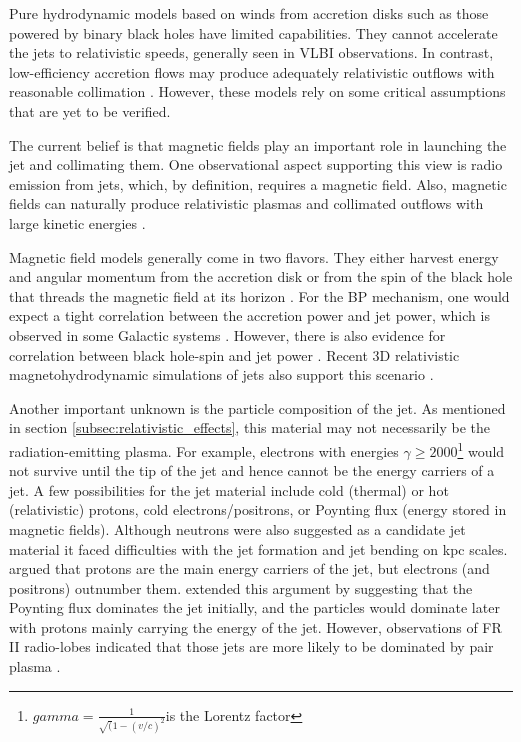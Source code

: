 Pure hydrodynamic models based on winds from accretion disks such as those powered by binary black holes \citep[e.g.,][]{1973A&A....24..337S} have limited capabilities. They cannot accelerate the jets to relativistic speeds, generally seen in VLBI observations. In contrast, low-efficiency accretion flows may produce adequately relativistic outflows with reasonable collimation \citep{rees1982ion,das1998observational}. However, these models rely on some critical assumptions that are yet to be verified.

The current belief is that magnetic fields play an important role in launching the jet and collimating them. One observational aspect supporting this view is radio emission from jets, which, by definition, requires a magnetic field. Also, magnetic fields can naturally produce relativistic plasmas and collimated outflows with large kinetic energies \citep[e.g.,][]{heinz2000jet}. 

Magnetic field models generally come in two flavors. They either harvest energy and angular momentum from the accretion disk \citep[e.g.,][BP]{blandford1982hydromagnetic} or from the spin of the black hole that threads the magnetic field at its horizon \citep[e.g.,][BZ]{blandford1977electromagnetic}. For the BP mechanism, one would expect a tight correlation between the accretion power and jet power, which is observed in some Galactic systems \citep[e.g.,][]{willott1999emission}. However, there is also evidence for correlation between black hole-spin and  jet power \citep[e.g.,][]{mcclintock2013black}. Recent 3D relativistic magnetohydrodynamic simulations of jets also support this scenario \citep{mckinney2006general,tchekhovskoy2011efficient,marti2019numerical}.

Another important unknown is the particle composition of the jet. As mentioned in section \ref{subsec:relativistic_effects}, this material may not necessarily be the radiation-emitting plasma. For example, electrons with energies $\gamma\geq2000$\footnote{$gamma=\frac{1}{\sqrt(1-(v/c)^2} $is the Lorentz factor} would not survive until the tip of the jet  \citep{2007RMxAC..27..188H} and hence cannot be the energy carriers of a jet. A few possibilities for the jet material include cold (thermal) or hot (relativistic) protons, cold electrons/positrons, or Poynting flux (energy stored in magnetic fields). Although neutrons were also suggested as a candidate jet material \citep{dermer2004nonthermal} it faced difficulties with the jet formation and jet bending on kpc scales. \citet{sikora2000pair} argued that protons are the main energy carriers of the jet, but electrons (and positrons) outnumber them. \citep{sikora2005quasar} extended this argument by suggesting that the Poynting flux dominates the jet initially, and the particles would dominate later with protons mainly carrying the energy of the jet. However, observations of FR II radio-lobes indicated that those jets are more likely to be dominated by pair plasma \citep{croston2018particle}.

